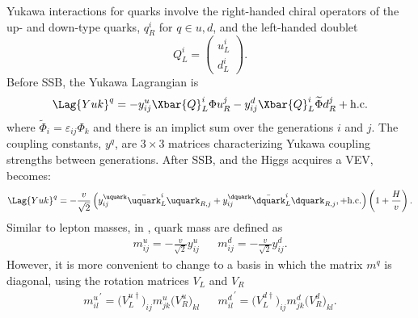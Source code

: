 Yukawa interactions for quarks involve the right-handed chiral operators of the up- and down-type
quarks, $q_R^i$ for $q\in{u,d}$, and the left-handed doublet
\begin{equation}
  Q_L^i = \begin{pmatrix}u^i_L\\d^i_L\end{pmatrix}.
\end{equation}
Before SSB, the Yukawa Lagrangian is
\begin{equation}
  \Lag{Yuk}^q = - y_{ij}^u\Xbar{Q}_L^i\Phi u_R^j
  - y_{ij}^d\Xbar{Q}_L^i\widetilde\Phi d_R^j + \mathrm{h.c.}
  \label{eq:th:lagyukq}
\end{equation}
where $\widetilde\Phi_i = \varepsilon_{ij}\Phi_k$ and there is an implict sum over the generations
$i$ and $j$.
The coupling constants, $y^{q}$, are $3\times3$ matrices characterizing Yukawa coupling strengths
between generations.
After SSB, and the Higgs acquires a VEV,  becomes:
\begin{equation}
  \Lag{Yuk}^q =
  - \frac{v}{\sqrt{2}}
  \left(
  y_{ij}^\uquark\bar\uquark_L^i\uquark_{R,j}
  + y_{ij}^\dquark\bar\dquark_L^i\dquark_{R,j},
  + \mathrm{h.c.}
  \right)
  \left(1 + \frac{H}{v}\right).
  \label{eq:th:lagyuk2}
\end{equation}
Similar to lepton masses, in , quark mass are defined as
\begin{align}
  m_{ij}^u = -\frac{v}{\sqrt{2}}y_{ij}^u &&
  m_{ij}^d = -\frac{v}{\sqrt{2}}y_{ij}^d.
\end{align}
However, it is more convenient to change to a basis in which the matrix $m^q$
is diagonal, using the rotation matrices $V_L$ and $V_R$
\begin{align}
  {m_{il}^{u}}^\prime =  \big(V_L^{u\dagger}\big)_{ij} m_{jk}^u\big(V_R^u\big)_{kl} &&
  {m_{il}^{d}}^\prime =  \big(V_L^{d\dagger}\big)_{ij} m_{jk}^d\big(V_R^d\big)_{kl}.
\end{align}
